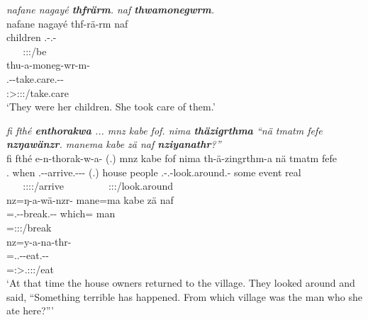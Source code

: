 \begin{exe}
	\ex \textit{nafane nagayé \textbf{thfrärm}. naf \textbf{thwamonegwrm}.}\\
	\glll nafane nagayé thf-rä-rm naf\\
	\Tsg{\Poss} children \Stnsg.\Betatwo-\Cop.\Ndu-\Dur{} \Tsg{\Erg}\\
	~ ~  {\footnotesize \Stpl:\Sbj:\Pst:\Dur/be} ~\\
	\sn
	\glll thu-a-moneg-wr-m-\Zero{}\\
	\Stnsg.\Betaone-\Vc-take.care.\Ext-\Ndu-\Dur\\
	{\footnotesize \Stsg:\Sbj>\Stpl:\Obj:\Pst:\Dur/take.care}\\
	\trans `They were her children. She took care of them.' 
	\label{ex006}
\end{exe}
\begin{exe}
	\ex \emph{fi fthé \textbf{enthorakwa} ... mnz kabe fof. nima \textbf{thäzigrthma} ``nä tmatm fefe \textbf{nzŋawänzr}. manema kabe zä naf \textbf{nziyanathr}?''}\\
	\glll fi fthé e-n-thorak-w-a-\Zero{} (.) mnz kabe fof nima th-ä-zingrthm-a nä tmatm fefe\\
	\Third.{\Abs} when \Stnsg.\Alph-\Venit-arrive.\Ext-\Ndu-\Pst-\Stsg{} (.) house people {\Emph} {\Quot} \Stnsg.\Gam-\Vc.\Ndu-look.around.\Rs-\Pst{} some event real\\
	~ ~ {\footnotesize \Stpl:\Sbj:\Pst:\Ipfv:\Venit/arrive} ~ ~ ~ ~ ~ {\footnotesize \Stpl:\Sbj:\Pst:\Pfv/look.around} ~ ~ ~\\
	\sn
	\glll nz=ŋ-a-wä-nzr-\Zero{} mane=ma kabe zä naf\\
	\Immpst{}=\M.\Alph-\Vc-break.\Ext-\Ndu-\Stsg{} which={\Char} man {\Prox} \Tsg{\Erg}\\
	{\footnotesize \Immpst=\Stsg:\Sbj:\Nonpast:\Ipfv/break} ~ ~ ~ ~\\
	\sn
	\glll nz=y-a-na-thr-\Zero{}\\
	\Immpst{}=\Tsg.\Masc.\Alph-\Vc-eat.\Ext-\Ndu-\Stsg{}\\
	 {\footnotesize \Immpst=\Stsg:\Sbj>\Tsg.\Masc:\Obj:\Nonpast:\Ipfv/eat}\\
	\trans `At that time the house owners returned to the village. They looked around and said, ``Something terrible has happened. From which village was the man who she ate here?''' 
	\label{ex007}
\end{exe}

